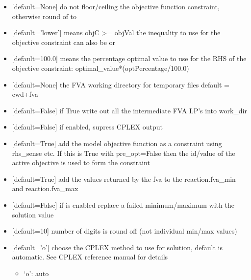 \documentclass[letterpaper,10pt,english]{sphinxmanual}
\begin{document}
\begin{fulllineitems}
\begin{itemize}
\item {} 
\sphinxAtStartPar
{}  {[}default=None{]} do not floor/ceiling the objective function constraint, otherwise round of to 

\item {} 
\sphinxAtStartPar
{} {[}default=’lower’{]} means objC \textgreater{}= objVal the inequality to use for the objective constraint can also be  or 

\item {} 
\sphinxAtStartPar
{} {[}default=100.0{]} means the percentage optimal value to use for the RHS of the objective constraint: optimal\_value*(optPercentage/100.0)

\item {} 
\sphinxAtStartPar
{} {[}default=None{]} the FVA working directory for temporary files default = cwd+fva

\item {} 
\sphinxAtStartPar
{} {[}default=False{]} if True write out all the intermediate FVA LP’s into work\_dir

\item {} 
\sphinxAtStartPar
{} {[}default=False{]} if enabled, supress CPLEX output

\item {} 
\sphinxAtStartPar
{} {[}default=True{]} add the model objective function as a constraint using rhs\_sense etc. If
this is True with pre\_opt=False then the id/value of the active objective is used to form the constraint

\item {} 
\sphinxAtStartPar
{} {[}default=True{]} add the values returned by the fva to the reaction.fva\_min and reaction.fva\_max

\item {} 
\sphinxAtStartPar
{} {[}default=False{]} if  is enabled replace a failed minimum/maximum with the solution value

\item {} 
\sphinxAtStartPar
{} {[}default=10{]} number of digits is round off (not individual min/max values)

\item {} 
\sphinxAtStartPar
{} {[}default=’o’{]} choose the CPLEX method to use for solution, default is automatic. See CPLEX reference manual for details
\begin{itemize}
\item {} 
\sphinxAtStartPar
‘o’: auto


\end{itemize}
\end{itemize}
\end{fulllineitems}
\end{document}
